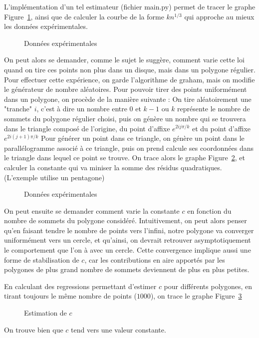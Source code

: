 \documentclass[a4paper,12pt,twoside]{article}
\begin{document}
		L'implémentation d'un tel estimateur (fichier main.py) permet de tracer le graphe Figure~\ref{fig:exp_cercle}, ainsi que de calculer la courbe de la forme $kn^{1/3}$ qui approche au mieux les données expérimentales.

		\begin{figure}[htpb]
			\centering
			
			\caption{Données expérimentales}
			\label{fig:exp_cercle}
		\end{figure}

		On peut alors se demander, comme le sujet le suggère, comment varie cette loi quand on tire ces points non plus dans un disque, mais dans un polygone régulier.
		Pour effectuer cette expérience, on garde l'algorithme de graham, mais on modifie le générateur de nombre aléatoires. Pour pouvoir tirer des points uniformément dans un polygone, on procède de la manière suivante : On tire aléatoirement une "tranche" $i$, c'est à dire un nombre entre $0$ et $k-1$ ou $k$ représente le nombre de sommets du polygone régulier choisi, puis on génère un nombre qui se trouvera dans le triangle composé de l'origine, du point d'affixe $e^{2ij\pi/k}$ et du point d'affixe $e^{2i(j+1)\pi/k}$
		Pour générer un point dans ce triangle, on génère un point dans le parallélogramme associé à ce triangle, puis on prend calcule ses coordonnées dans le triangle dans lequel ce point se trouve. 
		On trace alors le graphe Figure~\ref{fig:exp_poly}, et calculer la constante qui va miniser la somme des résidus quadratiques. (L'exemple utilise un pentagone)

		\begin{figure}[htpb]
			\centering
			
			\caption{Données expérimentales}
			\label{fig:exp_poly}
		\end{figure}

		On peut ensuite se demander comment varie la constante $c$ en fonction du nombre de sommets du polygone considéré. Intuitivement, on peut alors penser qu'en faisant tendre le nombre de points vers l'infini, notre polygone va converger uniformément vers un cercle, et qu'ainsi, on devrait retrouver asymptotiquement le comportement que l'on à avec un cercle. Cette convergence implique aussi une forme de stabilisation de $c$, car les contributions en aire apportés par les polygones de plus grand nombre de sommets deviennent de plus en plus petites.

		En calculant des regressions permettant d'estimer $c$ pour différents polygones, en tirant toujours le même nombre de points ($1000$), on trace le graphe Figure~\ref{fig:exp_c}

		\begin{figure}[htpb]
			\centering
			
			\caption{Estimation de $c$}
			\label{fig:exp_c}
		\end{figure}

		On trouve bien que $c$ tend vers une valeur constante.
\end{document}
